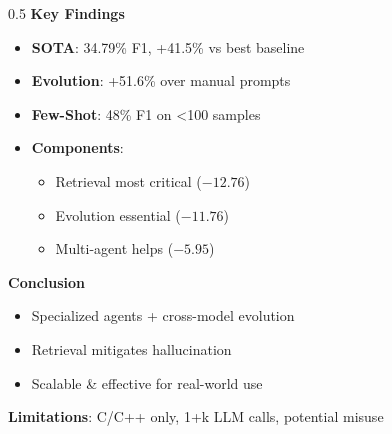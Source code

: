 \documentclass[aspectratio=169,10pt]{beamer}
\begin{document}
\begin{frame}
\begin{columns}[t]
\begin{column}{0.5\textwidth}
\textbf{\scriptsize Key Findings}
\begin{itemize}\setlength{\itemsep}{2pt}
  \item[\scriptsize$\blacktriangleright$] {\scriptsize \textbf{SOTA}: 34.79\% F1, +41.5\% vs best baseline}
  \item[\scriptsize$\blacktriangleright$] {\scriptsize \textbf{Evolution}: +51.6\% over manual prompts}
  \item[\scriptsize$\blacktriangleright$] {\scriptsize \textbf{Few-Shot}: 48\% F1 on <100 samples}
  \item[\scriptsize$\blacktriangleright$] {\scriptsize \textbf{Components}:
    \begin{itemize}\setlength{\itemsep}{0pt}
      \item[\scriptsize-] Retrieval most critical ($-12.76$)
      \item[\scriptsize-] Evolution essential ($-11.76$)
      \item[\scriptsize-] Multi-agent helps ($-5.95$)
    \end{itemize}}
\end{itemize}

\vspace{0.1cm}
\textbf{\scriptsize Conclusion}
\begin{itemize}\setlength{\itemsep}{2pt}
  \item[\scriptsize$\checkmark$] {\scriptsize Specialized agents + cross-model evolution}
  \item[\scriptsize$\checkmark$] {\scriptsize Retrieval mitigates hallucination}
  \item[\scriptsize$\checkmark$] {\scriptsize Scalable \& effective for real-world use}
\end{itemize}

\vspace{0.08cm}
{\scriptsize \textbf{Limitations}: C/C++ only, 1+k LLM calls, potential misuse}
\end{column}
\end{columns}
\end{frame}
\end{document}
